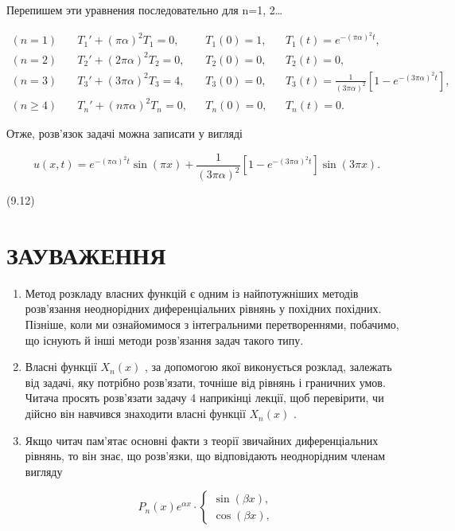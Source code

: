\documentclass[
  ukrainian,
]{article}
\begin{document}
Перепишем эти уравнения последовательно для n=1, 2\ldots{}

\[
\begin{aligned}
(n=1)\quad & T_1' + (\pi\alpha)^2 T_1 = 0, && T_1(0) = 1, && T_1(t) = e^{-(\pi\alpha)^2 t}, \\
(n=2)\quad & T_2' + (2\pi\alpha)^2 T_2 = 0, && T_2(0) = 0, && T_2(t) = 0, \\
(n=3)\quad & T_3' + (3\pi\alpha)^2 T_3 = 4, && T_3(0) = 0, && T_3(t) = \frac{1}{(3\pi\alpha)^2}\left[1 - e^{-(3\pi\alpha)^2 t}\right], \\
(n\geqslant 4)\quad & T_n' + (n\pi\alpha)^2 T_n = 0, && T_n(0) = 0, && T_n(t) = 0.
\end{aligned}
\]

Отже, розв'язок задачі можна записати у вигляді

\[
u(x, t) = e^{-(\pi\alpha)^2 t} \sin(\pi x) + \frac{1}{(3\pi\alpha)^2} [1 - e^{-(3\pi\alpha)^2 t}] \sin(3\pi x).
\]

(9.12)

\section{ЗАУВАЖЕННЯ}\label{ux437ux430ux443ux432ux430ux436ux435ux43dux43dux44f-1}

\begin{enumerate}
\def\labelenumi{\arabic{enumi}.}
\item
  Метод розкладу власних функцій є одним із найпотужніших методів
  розв'язання неоднорідних диференціальних рівнянь у похідних похідних.
  Пізніше, коли ми ознайомимося з інтегральними перетвореннями,
  побачимо, що існують й інші методи розв'язання задач такого типу.
\item
  Власні функції \(X_n(x)\) , за допомогою якої виконується розклад,
  залежать від задачі, яку потрібно розв'язати, точніше від рівнянь і
  граничних умов. Читача просять розв'язати задачу 4 наприкінці лекції,
  щоб перевірити, чи дійсно він навчився знаходити власні функції
  \(X_n(x)\) .
\item
  Якщо читач пам'ятає основні факти з теорії звичайних диференціальних
  рівнянь, то він знає, що розв'язки, що відповідають неоднорідним
  членам вигляду
\end{enumerate}

\[
P_n(x) e^{\alpha x} \cdot
\begin{cases} \sin{(\beta x)}, \\ \cos{(\beta x)}, \end{cases}
\]
\end{document}
